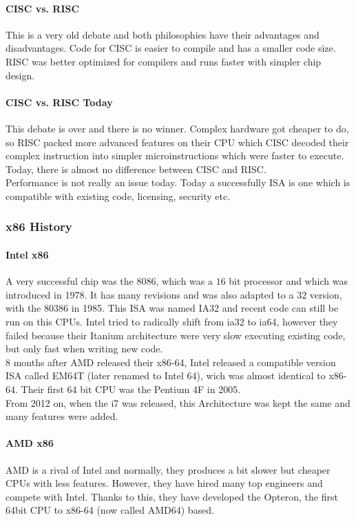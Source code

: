\paragraph{CISC vs. RISC}
This is a very old debate and both philosophies have their advantages and disadvantages. Code for CISC is easier to compile and has a smaller code size. RISC was better optimized for compilers and runs faster with simpler chip design.

\paragraph{CISC vs. RISC Today}
This debate is over and there is no winner. Complex hardware got cheaper to do, so RISC packed more advanced features on their CPU which CISC decoded their complex instruction into simpler microinstructions which were faster to execute. Today, there is almost no difference between CISC and RISC.\\
Performance is not really an issue today. Today a successfully ISA is one which is compatible with existing code, licensing, security etc.

\subsubsection{x86 History}
\paragraph{Intel x86}
A very successful chip was the $8086$, which was a $16$ bit processor and which was introduced in 1978. It has many revisions and was also adapted to a $32$ version, with the $80386$ in 1985. This ISA was named IA32 and recent code can still be run on this CPUs. Intel tried to radically shift from ia32 to ia64, however they failed because their Itanium architecture were very slow executing existing code, but only fast when writing new code.\\
$8$ months after AMD released their x86-64, Intel released a compatible version ISA called EM64T (later renamed to Intel 64), wich was almost identical to x86-64. Their first 64 bit CPU was the Pentium 4F in 2005.\\
From 2012 on, when the i7 was released, this Architecture was kept the same and many features were added.

\paragraph{AMD x86}
AMD is a rival of Intel and normally, they produces a bit slower but cheaper CPUs with less features. However, they have hired many top engineers and compete with Intel. Thanks to this, they have developed the Opteron, the first 64bit CPU to x86-64 (now called AMD64) based.

